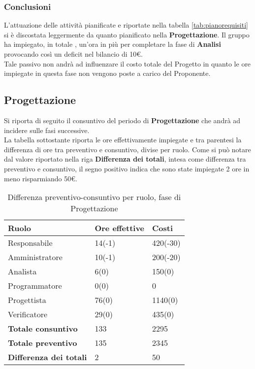 \subsubsection{Conclusioni}
L'attuazione delle attività pianificate e riportate nella tabella \ref{tab:pianorequisiti} si è discostata leggermente da quanto pianificato nella \textbf{Progettazione}.
Il gruppo ha impiegato, in totale , un'ora in più per completare la fase di \textbf{Analisi} provocando così un deficit nel bilancio di 10\euro.\\
Tale passivo non andrà ad influenzare il costo totale del Progetto in quanto le ore impiegate in questa fase non vengono poste a carico del Proponente.

\subsection{Progettazione}

Si riporta di seguito il consuntivo del periodo di \textbf{Progettazione} che andrà ad incidere sulle fasi successive.\\
La tabella sottostante riporta le ore effettivamente impiegate e tra parentesi la differenza di ore tra preventivo e consuntivo, divise per ruolo. Come si può notare dal valore riportato nella riga \textbf{Differenza dei totali}, intesa come differenza tra preventivo e consuntivo, il segno positivo indica che sono state impiegate 2 ore in meno risparmiando 50\euro.

	\begin{table}[H]
		\centering
	  \begin{tabular}{p{}p{}
		    							p{}}
		   \toprule Ruolo & Ore effettive & Costi \\
		   \midrule
		   Responsabile & 14(-1) & 420(-30) \\
		   Amministratore & 10(-1) & 200(-20) \\
		   Analista & 6(0) & 150(0) \\
		   Programmatore & 0(0) & 0 \\
		   Progettista & 76(0) & 1140(0) \\
		   Verificatore & 29(0) & 435(0) \\
		   \hline
		   \textbf{Totale consuntivo} & 133 & 2295 \\
		   \textbf{Totale preventivo} & 135 & 2345 \\
		   \textbf{Differenza dei totali} & 2 & 50 \\
		   \bottomrule
	 \end{tabular}
	 	\label{tab:costuntivoProgettazione}
	 	\caption{Differenza preventivo-consuntivo per ruolo, fase di Progettazione}
	\end{table}

